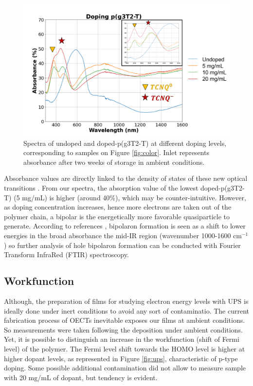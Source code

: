 \begin{figure}[ht]
  \centering
  \includegraphics[width=\textwidth]{Images/pdf/abs+inlet.pdf}
  \caption[Absorbance spectra of different doping levels of p(g3T2-T)]{Spectra of undoped and doped-p(g3T2-T) at different doping levels, corresponding to samples on Figure \ref{fig:color}. Inlet represents absorbance after two weeks of storage in ambient conditions.}
  \label{fig:abs}
\end{figure}

Absorbance values are directly linked to the density of states of these new optical transitions \cite{bredasPolaronsBipolaronsSolitons1985}. From our spectra, the absorption value of the lowest doped-p(g3T2-T) (5 mg/mL) is higher (around 40\%), which may be counter-intuitive. However, as doping concentration increases, hence more electrons are taken out of the polymer chain, a bipolar is the energetically more favorable quasiparticle to generate. According to references \cite{tanTuningOrganicElectrochemical2022}\cite{enenglDopinginducedAbsorptionBands2016}, bipolaron formation is seen as a shift to lower energies in the broad absorbance the mid-IR region (wavenumber 1000-1600 cm$^{-1}$) so further analysis of hole bipolaron formation can be conducted with Fourier Transform InfraRed (FTIR) spectroscopy.
 
\subsection{Workfunction}

Although, the preparation of films for studying electron energy levels with UPS is ideally done under inert conditions to avoid any sort of contaminatio. The current fabrication process of OECTs inevitable exposes our films at ambient conditions. So measurements were taken following the deposition under ambient conditions. Yet, it is possible to distinguish an increase in the workfunction (shift of Fermi level) of the polymer. The Fermi level shift towards the HOMO level is higher at higher dopant levels, as represented in Figure \ref{fig:ups}, characteristic of p-type doping. Some possible additional contamination did not allow to measure sample with 20 mg/mL of dopant, but tendency is evident.

